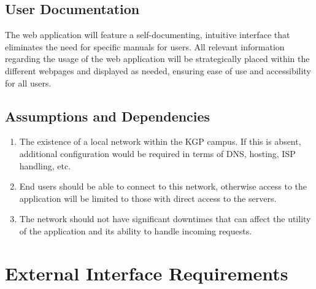 \documentclass{scrreprt}
\begin{document}
\section{User Documentation}
The web application will feature a self-documenting, intuitive interface that eliminates the need for specific manuals for users. All relevant information regarding the usage of the web application will be strategically placed within the different webpages and displayed as needed, ensuring ease of use and accessibility for all users.


\section{Assumptions and Dependencies}
\begin{enumerate}
    \item The existence of a local network within the KGP campus. If this is absent, additional configuration would be required in terms of DNS, hosting, ISP handling, etc.
    \item End users should be able to connect to this network, otherwise access to the application will be limited to those with direct access to the servers. 
    \item The network should not have significant downtimes that can affect the utility of the application and its ability to handle incoming requests.
\end{enumerate}

\chapter{External Interface Requirements}
\end{document}
